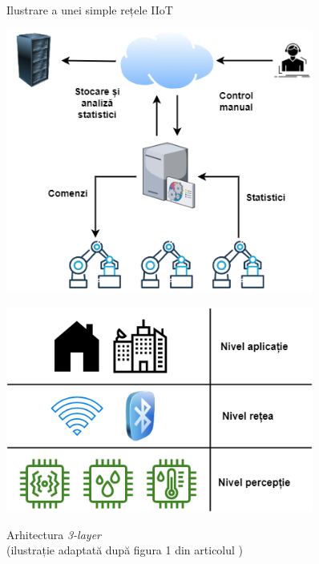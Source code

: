 \begin{figure}
    \centering
    \begin{minipage}{0.45\textwidth}
        \caption{Ilustrare a unei simple rețele IIoT}
        \centering
        \includegraphics[width=0.9\textwidth]{images/exemplu_retea_iot_Cap3.drawio.png}
        \label{fig:exemplu_iiot}
    \end{minipage}\hfill
    \begin{minipage}{0.45\textwidth}
        \caption{Arhitectura \textit{3-layer} \\ (ilustrație adaptată după figura 1 din articolul )}
        \centering
        \includegraphics[width=0.9\textwidth]{images/3_layer.drawio.png}
        \label{fig:arch_3layer}
    \end{minipage}
\end{figure}

